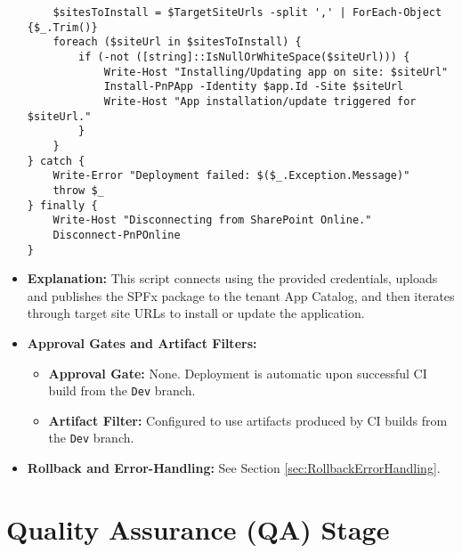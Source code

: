 \begin{itemize}
\begin{verbatim}
    $sitesToInstall = $TargetSiteUrls -split ',' | ForEach-Object {$_.Trim()}
    foreach ($siteUrl in $sitesToInstall) {
        if (-not ([string]::IsNullOrWhiteSpace($siteUrl))) {
            Write-Host "Installing/Updating app on site: $siteUrl"
            Install-PnPApp -Identity $app.Id -Site $siteUrl
            Write-Host "App installation/update triggered for $siteUrl."
        }
    }
} catch {
    Write-Error "Deployment failed: $($_.Exception.Message)"
    throw $_ 
} finally {
    Write-Host "Disconnecting from SharePoint Online."
    Disconnect-PnPOnline
}
\end{verbatim}
    \item \textbf{Explanation:} This script connects using the provided credentials, uploads and publishes the SPFx package to the tenant App Catalog, and then iterates through target site URLs to install or update the application.
    \item \textbf{Approval Gates and Artifact Filters:}
    \begin{itemize}
        \item \textbf{Approval Gate:} None. Deployment is automatic upon successful CI build from the \texttt{Dev} branch.
        \item \textbf{Artifact Filter:} Configured to use artifacts produced by CI builds from the \texttt{Dev} branch.
    \end{itemize}
    \item \textbf{Rollback and Error-Handling:} See Section \ref{sec:RollbackErrorHandling}.
\end{itemize}

\section{Quality Assurance (QA) Stage}
\label{sec:QAStage}

